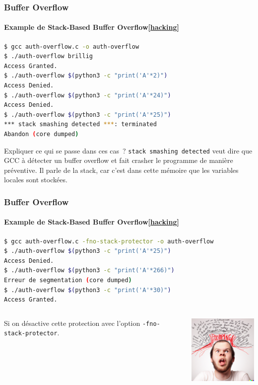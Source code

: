 \documentclass{beamer}
\begin{document}
    \begin{frame}[fragile]
        \frametitle{Buffer Overflow}
        \framesubtitle{Example de Stack-Based Buffer Overflow\cref{hacking}}
        \transdissolve
        \begin{lstlisting}[language=bash]
$ gcc auth-overflow.c -o auth-overflow
$ ./auth-overflow brillig
Access Granted.
$ ./auth-overflow $(python3 -c "print('A'*2)")
Access Denied.
$ ./auth-overflow $(python3 -c "print('A'*24)")
Access Denied.
$ ./auth-overflow $(python3 -c "print('A'*25)")
*** stack smashing detected ***: terminated
Abandon (core dumped)
        \end{lstlisting}
        Expliquer ce qui se passe dans ces cas~?
        \pause
        \bigbreak
        \lstinline{stack smashing detected} veut dire que GCC à détecter un buffer overflow et fait crasher le programme de manière préventive.
        Il parle de la stack, car c'est dans cette mémoire que les variables locales sont stockées.
    \end{frame}

    \begin{frame}[fragile]
        \frametitle{Buffer Overflow}
        \framesubtitle{Example de Stack-Based Buffer Overflow\cref{hacking}}
        \transdissolve
        \begin{lstlisting}[language=bash]
$ gcc auth-overflow.c -fno-stack-protector -o auth-overflow
$ ./auth-overflow $(python3 -c "print('A'*25)")
Access Denied.
$ ./auth-overflow $(python3 -c "print('A'*266)")
Erreur de segmentation (core dumped)
$ ./auth-overflow $(python3 -c "print('A'*30)")
Access Granted.
        \end{lstlisting}
        \bigbreak
        \begin{columns}
            \begin{column}{0.6\textwidth}
                Si on désactive cette protection avec l'option \lstinline{-fno-stack-protector}.
            \end{column}
            \begin{column}{0.4\textwidth}
                \includegraphics[width=4cm]{image/programmer-head-exploding}
            \end{column}
        \end{columns}
    \end{frame}
\end{document}
